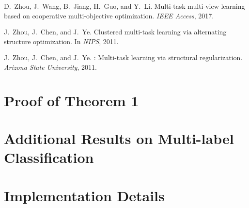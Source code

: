 \documentclass{article}
\begin{document}
{\begin{thebibliography}{60}
D.~Zhou, J.~Wang, B.~Jiang, H.~Guo, and Y.~Li.
\newblock Multi-task multi-view learning based on cooperative multi-objective
  optimization.
\newblock \emph{IEEE Access}, 2017{}.

J.~Zhou, J.~Chen, and J.~Ye.
\newblock Clustered multi-task learning via alternating structure optimization.
\newblock In \emph{{NIPS}}, 2011{}.

J.~Zhou, J.~Chen, and J.~Ye.
: Multi-task learning via structural regularization.
\newblock \emph{Arizona State University}, 2011{}.

\end{thebibliography}


}

\appendix
\section{Proof of Theorem 1}

\section{Additional Results on Multi-label Classification}

\section{Implementation Details}

\end{document}

